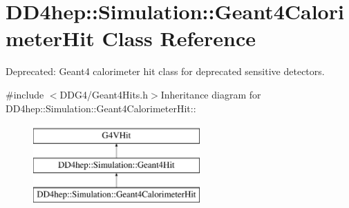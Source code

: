 \hypertarget{class_d_d4hep_1_1_simulation_1_1_geant4_calorimeter_hit}{
\section{DD4hep::Simulation::Geant4CalorimeterHit Class Reference}
\label{class_d_d4hep_1_1_simulation_1_1_geant4_calorimeter_hit}
}


Deprecated: Geant4 calorimeter hit class for deprecated sensitive detectors.  


{\ttfamily \#include $<$DDG4/Geant4Hits.h$>$}Inheritance diagram for DD4hep::Simulation::Geant4CalorimeterHit::\begin{figure}[H]
\begin{center}
\leavevmode
\includegraphics[height=3cm]{class_d_d4hep_1_1_simulation_1_1_geant4_calorimeter_hit}
\end{center}
\end{figure}
